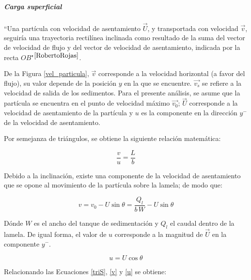 \subparagraph{Carga superficial} \label{carga}

\noindent
\justify

``Una part\'icula con velocidad de asentamiento $\vec{U}$, y transportada con velocidad $\vec{v}$, seguir\'ia una trayectoria rectil\'inea inclinada como resultado de la suma del vector de velocidad de flujo y del vector de velocidad de asentamiento, indicada por la recta $OB$"$^{\cite{RobertoRojas}}$.



\noindent
\justify

De la Figura \ref{vel_particula}, $\vec{v}$ corresponde a la velocidad horizontal (a favor del flujo), su valor depende de la posici\'on $y$ en la que se encuentre. $\vec{v_s}$ se refiere a la velocidad de salida de los sedimentos. Para el presente an\'alisis, se asume que la part\'icula se encuentra en el punto de velocidad m\'aximo $\vec{v_0}$; $\vec{U}$ corresponde a la velocidad de asentamiento de la part\'icula y $u$ es la componente en la direcci\'on $y^{-}$ de la velocidad de asentamiento.

\noindent
\justify

Por semejanza de tri\'angulos, se obtiene la siguiente relaci\'on matem\'atica:

\begin{equation}
	\frac{v}{u} = \frac{L}{b}
	\label{triS}
\end{equation}

\noindent
\justify

Debido a la inclinaci\'on, existe una componente de la velocidad de asentamiento que se opone al movimiento de la part\'icula sobre la lamela; de modo que:

\begin{equation}
	v = v_0 - U \sin \theta = \frac{Q _l}{b \, W} - U \sin \theta
	\label{v}
\end{equation}

\noindent
\justify

D\'onde $W$ es el ancho del tanque de sedimentaci\'on y $Q_l$ el caudal dentro de la lamela. De igual forma, el valor de $u$ corresponde a la magnitud de $\vec{U}$ en la componente $y^{-}$.

\begin{equation}
	u = U \cos \theta
	\label{u}
\end{equation}

\noindent
\justify

Relacionando las Ecuaciones \ref{triS}, \ref{v} y \ref{u} se obtiene:

